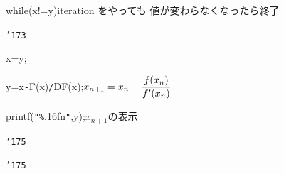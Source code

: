 \documentclass{article}
\begin{document}
\noindent
\mbox{}{\tt\mc {}\charwd}while{\tt\mc {}\charwd}(x{\tt\mc {}\charwd}!={\tt\mc {}\charwd}y){\tt\mc {}\charwd}{\tt\mc {}\charwd}{\tt\mc {}\charwd}\rm\mc {\tt /}{\tt *}\charwd  {}iteration をやっても
					   値が変わらなくなったら終了
					   \hfill \rm\mc {}\charwd {\tt *}{\tt /}
\tt\mc 

\noindent
\mbox{}{\tt\mc {}\charwd}{\tt\char'173}

\noindent
\mbox{}{\tt\mc {}\charwd}x{\tt\mc {}\charwd}={\tt\mc {}\charwd}y;

\noindent
\mbox{}{\tt\mc {}\charwd}y{\tt\mc {}\charwd}={\tt\mc {}\charwd}x{\tt\mc {}\charwd}{\tt -}{\tt\mc {}\charwd}F(x){\tt\mc {}\charwd}{\tt /}{\tt\mc {}\charwd}DF(x);{\tt\mc {}\charwd}{\tt\mc {}\charwd}{\tt\mc {}\charwd}\rm\mc {\tt /}{\tt *}\charwd $\displaystyle x_{n+1}=x_n
				   	- {f(x_n)\over f'(x_n)}$\rm\mc {}\charwd  \hfill \rm\mc {}\charwd {\tt *}{\tt /}
\tt\mc 

\noindent
\mbox{}{\tt\mc {}\charwd}printf({\tt "}{\tt\%}.16f{\tt{}}n{\tt "},{\tt\mc {}\charwd}y);{\tt\mc {}\charwd}{\tt\mc {}\charwd}\rm\mc {\tt /}{\tt *}\charwd $x_{n+1}$\rm\mc {}\charwd の表示\charwd  \hfill \rm\mc {}\charwd {\tt *}{\tt /}
\tt\mc 

\noindent
\mbox{}{\tt\mc {}\charwd}{\tt\char'175}

\noindent
\mbox{}{\tt\char'175}

\noindent
\mbox{}

\rm\mc
\end{document}

